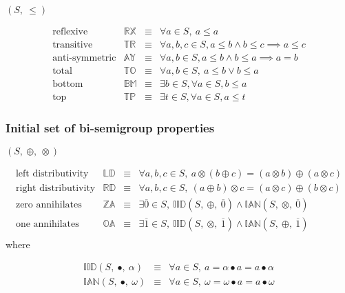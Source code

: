 \documentclass[10pt]{article}
\newcommand{\propname}[1]{{\mathbb{#1}}}
\begin{document}
$(S,\ \leq)$

\[ 
\begin{array}{c|ccl} 
\mbox{reflexive} 
   & \propname{RX} 
   & \equiv 
   & \forall a \in S,\ a \leq a 
   \\ 
\mbox{transitive}    
   & \propname{TR} 
   & \equiv 
   & \forall a, b, c \in S, a\leq b \wedge b \leq c \implies a \leq c 
   \\ 
\mbox{anti-symmetric} 
   & \propname{AY} 
   & \equiv 
   & \forall a, b\in S, a\leq b \wedge b \leq a \implies a = b
   \\ 
\mbox{total} 
   & \propname{TO} 
   & \equiv 
   & \forall a, b \in S,\ a\leq b \vee  b\leq a
   \\
\mbox{bottom}   
   & \propname{BM} 
   & \equiv 
   & \exists b \in S, \forall a \in S, b\leq a
   \\ 
\mbox{top}   
   & \propname{TP} 
   & \equiv 
   & \exists t \in S, \forall a \in S, a\leq t
\end{array} 
\] 


\subsubsection{Initial set of bi-semigroup properties}

$(S,\ \oplus,\ \otimes)$

\[ 
\begin{array}{c|ccl} 
\mbox{left distributivity} 
    & \propname{LD}
    & \equiv 
    & \forall a, b, c \in S,\ a\otimes(b \oplus c) =  (a\otimes b) \oplus (a\otimes c) \\ 
\mbox{right distributivity} 
    & \propname{RD}
    & \equiv 
    & \forall a, b, c \in S,\ (a\oplus b)\otimes c  =   (a\otimes c) \oplus (b\otimes c)\\ 
\mbox{zero annihilates} 
    & \propname{ZA}
    & \equiv 
    & \exists \overline{0} \in S,\ \propname{IID}(S,\ \oplus,\ \overline{0}) \wedge \propname{IAN}(S,\ \otimes,\ \overline{0})  \\ 
\mbox{one annihilates} 
    & \propname{OA}
    & \equiv 
    & \exists \overline{1} \in S,\ \propname{IID}(S,\ \otimes,\ \overline{1}) \wedge \propname{IAN}(S,\ \oplus,\ \overline{1})  \\ 
\end{array} 
\] 
where 

\[ 
\begin{array}{rcl} 
\propname{IID}(S,\ \bullet,\ \alpha)  
    & \equiv 
    & \forall a\in S,\ a = \alpha \bullet a = a \bullet \alpha\\ 
\propname{IAN}(S,\ \bullet,\ \omega)  
    & \equiv 
    & \forall a\in S,\ \omega = \omega \bullet a = a \bullet \omega\\ 
\end{array} 
\] 
\end{document}
